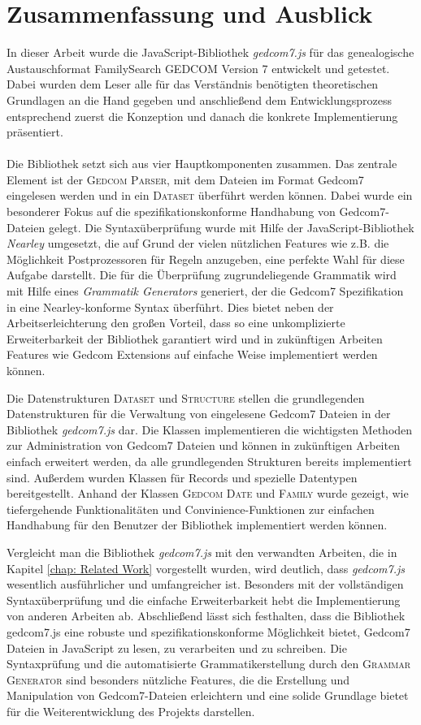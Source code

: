 \chapter{Zusammenfassung und Ausblick}
\label{chap: Zusammenfassung und Ausblick}
In dieser Arbeit wurde die JavaScript-Bibliothek \textit{gedcom7.js} für das genealogische Austauschformat FamilySearch GEDCOM Version 7 entwickelt und getestet. Dabei wurden dem Leser alle für das Verständnis benötigten theoretischen Grundlagen an die Hand gegeben und anschließend dem Entwicklungsprozess entsprechend zuerst die Konzeption und danach die konkrete Implementierung präsentiert. 
\\ \\
Die Bibliothek setzt sich aus vier Hauptkomponenten zusammen. Das zentrale Element ist der \textsc{Gedcom Parser}, mit dem Dateien im Format Gedcom7 eingelesen werden und in ein \textsc{Dataset} überführt werden können.
Dabei wurde ein besonderer Fokus auf die spezifikationskonforme Handhabung von Gedcom7-Dateien gelegt. Die Syntaxüberprüfung wurde mit Hilfe der JavaScript-Bibliothek \textit{Nearley} umgesetzt, die auf Grund der vielen nützlichen Features wie z.B. die Möglichkeit Postprozessoren für Regeln anzugeben, eine perfekte Wahl für diese Aufgabe darstellt. Die für die Überprüfung zugrundeliegende Grammatik wird mit Hilfe eines \textit{Grammatik Generators} generiert, der die Gedcom7 Spezifikation in eine Nearley-konforme Syntax überführt. Dies bietet neben der Arbeitserleichterung den großen Vorteil, dass so eine unkomplizierte Erweiterbarkeit der Bibliothek garantiert wird und in zukünftigen Arbeiten Features wie Gedcom Extensions auf einfache Weise implementiert werden können. 


Die Datenstrukturen \textsc{Dataset} und \textsc{Structure} stellen die grundlegenden Datenstrukturen für die Verwaltung von eingelesene Gedcom7 Dateien in der Bibliothek \textit{gedcom7.js} dar. Die Klassen implementieren die wichtigsten Methoden zur Administration von Gedcom7 Dateien und können in zukünftigen Arbeiten einfach erweitert werden, da alle grundlegenden Strukturen bereits implementiert sind. Außerdem wurden Klassen für Records und spezielle Datentypen bereitgestellt. Anhand der Klassen \textsc{Gedcom Date} und \textsc{Family} wurde gezeigt, wie tiefergehende Funktionalitäten und Convinience-Funktionen zur einfachen Handhabung für den Benutzer der Bibliothek implementiert werden können. 


Vergleicht man die Bibliothek \textit{gedcom7.js} mit den verwandten Arbeiten, die in Kapitel \ref{chap: Related Work} vorgestellt wurden, wird deutlich, dass \textit{gedcom7.js} wesentlich ausführlicher und umfangreicher ist. Besonders mit der vollständigen Syntaxüberprüfung und die einfache Erweiterbarkeit hebt die Implementierung von anderen Arbeiten ab. 
\newpage
{
\noindent
Abschließend lässt sich festhalten, dass die Bibliothek gedcom7.js eine robuste und spezifikationskonforme Möglichkeit bietet, Gedcom7 Dateien in JavaScript zu lesen, zu verarbeiten und zu schreiben. Die Syntaxprüfung und die automatisierte Grammatikerstellung durch den \textsc{Grammar Generator} sind besonders nützliche Features, die die Erstellung und Manipulation von Gedcom7-Dateien erleichtern und eine solide Grundlage bietet für die Weiterentwicklung des Projekts darstellen.
}